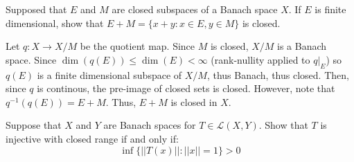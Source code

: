 \documentclass[12pt]{article}
\begin{document}
\begin{problem}{34}
    Supposed that $E$ and $M$ are closed subspaces of a Banach space $X$. If $E$ is finite dimensional, show that $E+M = \{x+y: x \in E, y \in M\}$ is closed. 
\end{problem}
\begin{solution}
    Let $q: X \to X/M$ be the quotient map. Since $M$ is closed, $X/M$ is a Banach space. Since $\dim(q(E)) \leq \dim(E) < \infty$ (rank-nullity applied to $q|_E$) so $q(E)$ is a finite dimensional subspace of $X/M$, thus Banach, thus closed. Then, since $q$ is continous, the pre-image of closed sets is closed. However, note that $q^{-1}(q(E)) = E + M$. Thus, $E + M$ is closed in $X$.
\end{solution}
\newpage 

\begin{problem}{35}
    Suppose that $X$ and $Y$ are Banach spaces for $T \in \mathcal{L}(X, Y)$. Show that $T$ is injective with closed range if and only if: 
    \[ \inf \{||T(x)|| : ||x|| = 1\} > 0 \]
\end{problem}
\end{document}
